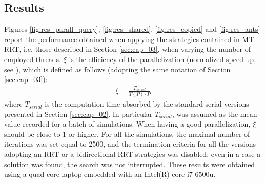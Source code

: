 \subsection{Results}

Figures \ref{fig:res_parall_query}, \ref{fig:res_shared}, \ref{fig:res_copied} and \ref{fig:res_ants} report the performance obtained when applying the strategies contained in MT-RRT, i.e. those described in Section \ref{sec:cap_03}, when varying the number of employed threads.
$\xi$ is the efficiency of the parallelization (normalized speed up, see \cite{efficiency_PC}), which is defined as follows (adopting the same notation of Section \ref{sec:cap_03}):
\begin{eqnarray}
\xi = \frac{T_{serial}}{T(P) \cdot P}
\end{eqnarray}
where $T_{serial}$ is the computation time absorbed by the standard serial versions presented in Section \ref{sec:cap_02}. In particular $T_{serial}$, was assumed as the mean value recorded for a batch of simulations. When having a good parallelization, $\xi$ should be close to 1 or higher. 
For all the simulations, the maximal number of iterations was set equal to 2500, and the termination criteria for all the versions adopting an RRT or a bidirectional RRT strategies was disabled: even in a case a solution was found, the search was not interrupted.
These results were obtained using a quad core laptop embedded with an Intel(R) core i7-6500u.

